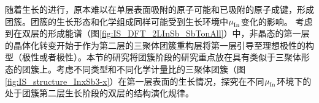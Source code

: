 随着生长的进行，原本难以在单层表面吸附的原子可能和已吸附的原子成键，形成团簇。团簇的生长形态和化学组成同样可能受到生长环境中$\it \mu_{\rm In}^{\rm } \it$变化的影响。
考虑到在双层的形成能谱（图\ref{fig:IS_DFT_2LInSb_SbTonAll}）中，非晶态的第一层的晶体化转变开始于作为第二层的三聚体团簇重构层将第一层引导至理想极性的构型（极性或者极性）。本节的研究将团簇阶段的研究重点放在具有类似于三聚体形态的团簇上。考虑不同类型和不同化学计量比的三聚体团簇（图\ref{fig:IS_structure_InxSb3-x}）在第一层表面的生长情况，探究在不同$\it \mu_{\rm In}^{\rm } \it$环境下的处于团簇第二层生长阶段的双层的结构演化规律。

\begin{figure}[!ht]
    \subfloat[]{
}
\end{figure}
